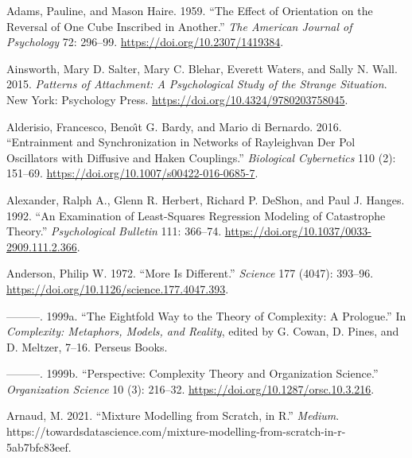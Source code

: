 \documentclass[
  a4paper,
  DIV=11,
  numbers=noendperiod,
  oneside]{scrreprt}
\newlength{\cslhangindent}
\newenvironment{CSLReferences}[2] %
 {\begin{list}{}{%
  \setlength{\itemindent}{0pt}
  \setlength{\leftmargin}{0pt}
  \setlength{\parsep}{0pt}
  \ifodd #1
   \setlength{\leftmargin}{\cslhangindent}
   \setlength{\itemindent}{-1\cslhangindent}
  \fi
  \setlength{\itemsep}{#2\baselineskip}}}
 {\end{list}}
\begin{document}
\begin{CSLReferences}{1}{0}
Adams, Pauline, and Mason Haire. 1959. {``The Effect of Orientation on
the Reversal of One Cube Inscribed in Another.''} \emph{The American
Journal of Psychology} 72: 296--99.
\url{https://doi.org/10.2307/1419384}.

Ainsworth, Mary D. Salter, Mary C. Blehar, Everett Waters, and Sally N.
Wall. 2015. \emph{Patterns of {Attachment}: {A Psychological Study} of
the {Strange Situation}}. {New York}: {Psychology Press}.
\url{https://doi.org/10.4324/9780203758045}.

Alderisio, Francesco, Benoı̂t G. Bardy, and Mario di Bernardo. 2016.
{``Entrainment and Synchronization in Networks of
{Rayleigh}\textendash van Der {Pol} Oscillators with Diffusive and
{Haken} Couplings.''}
\emph{Biological Cybernetics} 110 (2): 151--69.
\url{https://doi.org/10.1007/s00422-016-0685-7}.

Alexander, Ralph A., Glenn R. Herbert, Richard P. DeShon, and Paul J.
Hanges. 1992. {``An Examination of Least-Squares Regression Modeling of
Catastrophe Theory.''} \emph{Psychological Bulletin} 111: 366--74.
\url{https://doi.org/10.1037/0033-2909.111.2.366}.

Anderson, Philip W. 1972. {``More {Is Different}.''} \emph{Science} 177
(4047): 393--96. \url{https://doi.org/10.1126/science.177.4047.393}.

---------. 1999a. {``The {Eightfold Way} to the {Theory} of
{Complexity}: {A Prologue}.''} In \emph{Complexity: Metaphors, Models,
and Reality}, edited by G. Cowan, D. Pines, and D. Meltzer, 7--16.
{Perseus Books}.

---------. 1999b. {``Perspective: {Complexity Theory} and {Organization
Science}.''} \emph{Organization Science} 10 (3): 216--32.
\url{https://doi.org/10.1287/orsc.10.3.216}.

Arnaud, M. 2021. {``Mixture Modelling from Scratch, in {R}.''}
\emph{Medium}.
https://towardsdatascience.com/mixture-modelling-from-scratch-in-r-5ab7bfc83eef.


\end{CSLReferences}
\end{document}
